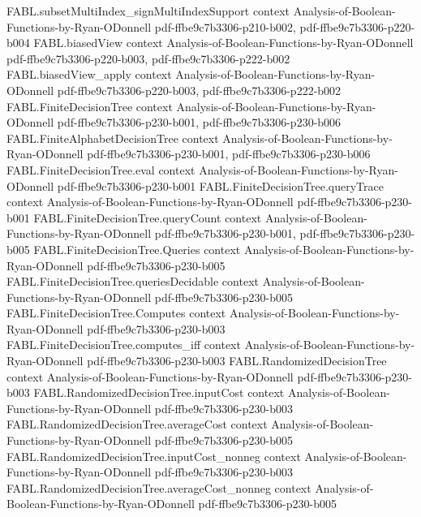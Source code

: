 \begin{theorem}
\proofstep
  {FABL.subsetMultiIndex_signMultiIndexSupport}
  {context}
  {Analysis-of-Boolean-Functions-by-Ryan-ODonnell}
  {pdf-ffbe9c7b3306-p210-b002,
    pdf-ffbe9c7b3306-p220-b004}
\proofstep
  {FABL.biasedView}
  {context}
  {Analysis-of-Boolean-Functions-by-Ryan-ODonnell}
  {pdf-ffbe9c7b3306-p220-b003,
    pdf-ffbe9c7b3306-p222-b002}
\proofstep
  {FABL.biasedView_apply}
  {context}
  {Analysis-of-Boolean-Functions-by-Ryan-ODonnell}
  {pdf-ffbe9c7b3306-p220-b003,
    pdf-ffbe9c7b3306-p222-b002}
\proofstep
  {FABL.FiniteDecisionTree}
  {context}
  {Analysis-of-Boolean-Functions-by-Ryan-ODonnell}
  {pdf-ffbe9c7b3306-p230-b001,
    pdf-ffbe9c7b3306-p230-b006}
\proofstep
  {FABL.FiniteAlphabetDecisionTree}
  {context}
  {Analysis-of-Boolean-Functions-by-Ryan-ODonnell}
  {pdf-ffbe9c7b3306-p230-b001,
    pdf-ffbe9c7b3306-p230-b006}
\proofstep
  {FABL.FiniteDecisionTree.eval}
  {context}
  {Analysis-of-Boolean-Functions-by-Ryan-ODonnell}
  {pdf-ffbe9c7b3306-p230-b001}
\proofstep
  {FABL.FiniteDecisionTree.queryTrace}
  {context}
  {Analysis-of-Boolean-Functions-by-Ryan-ODonnell}
  {pdf-ffbe9c7b3306-p230-b001}
\proofstep
  {FABL.FiniteDecisionTree.queryCount}
  {context}
  {Analysis-of-Boolean-Functions-by-Ryan-ODonnell}
  {pdf-ffbe9c7b3306-p230-b001,
    pdf-ffbe9c7b3306-p230-b005}
\proofstep
  {FABL.FiniteDecisionTree.Queries}
  {context}
  {Analysis-of-Boolean-Functions-by-Ryan-ODonnell}
  {pdf-ffbe9c7b3306-p230-b005}
\proofstep
  {FABL.FiniteDecisionTree.queriesDecidable}
  {context}
  {Analysis-of-Boolean-Functions-by-Ryan-ODonnell}
  {pdf-ffbe9c7b3306-p230-b005}
\proofstep
  {FABL.FiniteDecisionTree.Computes}
  {context}
  {Analysis-of-Boolean-Functions-by-Ryan-ODonnell}
  {pdf-ffbe9c7b3306-p230-b003}
\proofstep
  {FABL.FiniteDecisionTree.computes_iff}
  {context}
  {Analysis-of-Boolean-Functions-by-Ryan-ODonnell}
  {pdf-ffbe9c7b3306-p230-b003}
\proofstep
  {FABL.RandomizedDecisionTree}
  {context}
  {Analysis-of-Boolean-Functions-by-Ryan-ODonnell}
  {pdf-ffbe9c7b3306-p230-b003}
\proofstep
  {FABL.RandomizedDecisionTree.inputCost}
  {context}
  {Analysis-of-Boolean-Functions-by-Ryan-ODonnell}
  {pdf-ffbe9c7b3306-p230-b003}
\proofstep
  {FABL.RandomizedDecisionTree.averageCost}
  {context}
  {Analysis-of-Boolean-Functions-by-Ryan-ODonnell}
  {pdf-ffbe9c7b3306-p230-b005}
\proofstep
  {FABL.RandomizedDecisionTree.inputCost_nonneg}
  {context}
  {Analysis-of-Boolean-Functions-by-Ryan-ODonnell}
  {pdf-ffbe9c7b3306-p230-b003}
\proofstep
  {FABL.RandomizedDecisionTree.averageCost_nonneg}
  {context}
  {Analysis-of-Boolean-Functions-by-Ryan-ODonnell}
  {pdf-ffbe9c7b3306-p230-b005}

\end{theorem}
